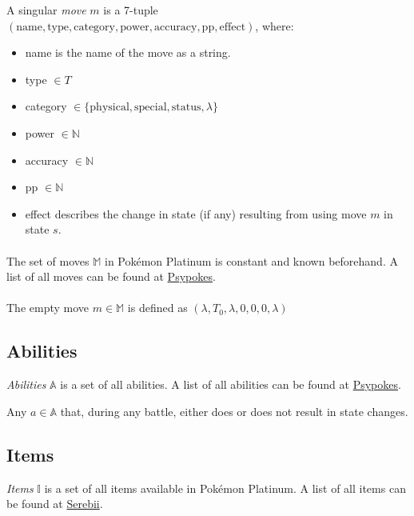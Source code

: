 A singular \emph{move} $m$ is a 7-tuple $(\text{name}, \text{type}, \text{category}, \text{power}, \text{accuracy}, \text{pp}, \text{effect})$, where:
\begin{itemize}
    \item name is the name of the move as a string.
    \item type $\in T$
    \item category $\in \{ \text{physical}, \text{special}, \text{status}, \lambda \}$
    \item power $\in \mathbb{N}$ 
    \item accuracy $\in \mathbb{N}$ 
    \item pp $\in \mathbb{N}$
    \item effect describes the change in state (if any) resulting from using move $m$ in state $s$.
\end{itemize}

\paragraph{}
The set of moves $\mathbb{M}$ in Pokémon Platinum is constant and known beforehand. A list of all moves can be found at \href{http://www.psypokes.com/dpphgss/attacks.php}{Psypokes}.

\paragraph{}
The empty move $m \in \mathbb{M}$ is defined as $(\lambda, T_0, \lambda, 0, 0, 0, \lambda)$

\subsection{Abilities}

\emph{Abilities} $\mathbb{A}$ is a set of all abilities. A list of all abilities can be found at \href{http://www.psypokes.com/dpphgss/abilities.php}{Psypokes}.

Any $a \in \mathbb{A}$ that, during any battle, either does or does not result in state changes.

\subsection{Items}

\emph{Items} $\mathbb{I}$ is a set of all items available in Pokémon Platinum. A list of all items can be found at \href{https://www.serebii.net/platinum/items.shtml}{Serebii}.

